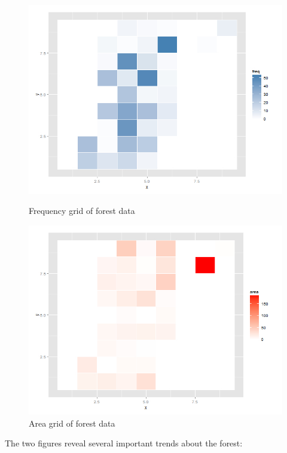 \documentclass{article}
\begin{document}
\begin{figure}
  \begin{minipage}[b]{0.475\linewidth}
  \centering
  \includegraphics[width=\textwidth]{freq.jpg}
  \caption{Frequency grid of forest data}
  \label{fig:fire_freq}
\end{minipage}
\hspace{0.5cm}
  \begin{minipage}[b]{0.475\linewidth}
  \centering
  \includegraphics[width=\textwidth]{area.jpg}
  \caption{Area grid of forest data}
  \label{fig:fire_area}
\end{minipage}
\end{figure}

The two figures reveal several important trends about the forest:
\end{document}
